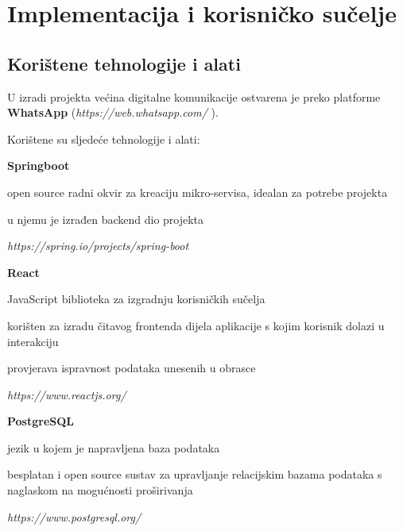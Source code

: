 \chapter{Implementacija i korisničko sučelje}
		
		
		\section{Korištene tehnologije i alati}
		
			
			  U izradi projekta većina digitalne komunikacije ostvarena je preko platforme
			  \textbf{WhatsApp} (\textit{https://web.whatsapp.com/} ).

			  Korištene su sljedeće tehnologije i alati:

			  \begin{packed_item}

				\item \textbf{Springboot}
					\begin{packed_item}
						\item open source radni okvir za kreaciju mikro-servisa, idealan za potrebe projekta
						\item u njemu je izrađen backend dio projekta 
						\item \textit{https://spring.io/projects/spring-boot}
					\end{packed_item}

				\item \textbf{React}
				\begin{packed_item}
					\item JavaScript biblioteka za izgradnju korisničkih sučelja 
					\item korišten za izradu čitavog frontenda dijela aplikacije s kojim korisnik dolazi u interakciju 
					\item provjerava ispravnost podataka unesenih u obrasce 
					\item \textit{ https://www.reactjs.org/}
				\end{packed_item}

				\item \textbf{PostgreSQL }
				\begin{packed_item}
					\item jezik u kojem je napravljena baza podataka  
					\item besplatan i open source sustav za upravljanje relacijskim bazama podataka s naglaskom na mogućnosti proširivanja  
					\item \textit{ https://www.postgresql.org/}
				\end{packed_item}
				

\end{packed_item}

